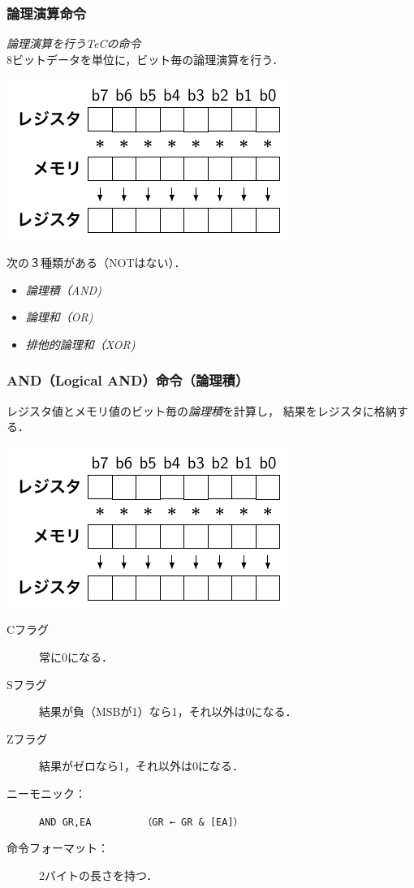 \documentclass{beamer}                 %
\begin{document}
\begin{frame}
  \frametitle{論理演算命令}
  \emph{論理演算を行うTeCの命令} \\
  8ビットデータを単位に，ビット毎の論理演算を行う． \\
  \centerline{\includegraphics[scale=0.8]{../Tikz/land.pdf}}
  \vfill
  次の３種類がある（NOTはない）．
  \begin{itemize}
  \item \emph{論理積（AND)}
  \item \emph{論理和（OR)}
  \item \emph{排他的論理和（XOR)}
  \end{itemize}
  \vfill
\end{frame}

\begin{frame}
  \frametitle{AND（Logical AND）命令（論理積）}
  \begin{minipage}{0.48\columnwidth}
  レジスタ値とメモリ値のビット毎の\emph{論理積}を計算し，
  結果をレジスタに格納する．
  \end{minipage}
  \begin{minipage}{0.48\columnwidth}
  \centerline{\includegraphics[scale=0.8]{../Tikz/land.pdf}}
  \end{minipage}
  \vfill
  \begin{description}
  \item[Cフラグ] 常に0になる．
  \item[Sフラグ] 結果が負（MSBが1）なら1，それ以外は0になる．
  \item[Zフラグ] 結果がゼロなら1，それ以外は0になる．
    \vfill
  \item[ニーモニック：]\texttt{AND GR,EA}~~~~~~~~~\texttt{（GR ← GR \& [EA]）}
    \vfill
  \item[命令フォーマット：] 2バイトの長さを持つ．\\
    {\small{}}
  \end{description}
  \vfill
\end{frame}
\end{document}
